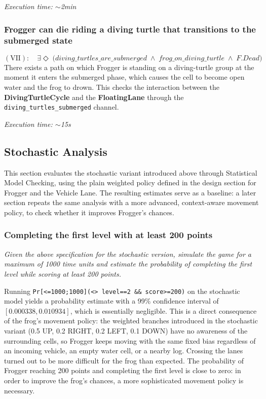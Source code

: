 \documentclass[a4paper]{article}
\begin{document}
\hfill \textit{Execution time: $\sim$2min}
\subsubsection*{Frogger can die riding a diving turtle that transitions to the submerged state}
\[ (\textrm{VII}) : \quad \exists \Diamond \; \big( 
   \textit{diving\_turtles\_are\_submerged} \;\wedge\; 
   \textit{frog\_on\_diving\_turtle} \;\wedge\; F.Dead\big) \]
There exists a path on which Frogger is standing on a diving-turtle group at 
the moment it enters the submerged phase, which causes the cell to become open 
water and the frog to drown. This checks the interaction between the 
\textbf{DivingTurtleCycle} and the \textbf{FloatingLane} through the 
\texttt{diving\_turtles\_submerged} channel.

\hfill \textit{Execution time: $\sim$15s}

\subsection{Stochastic Analysis}
This section evaluates the stochastic variant introduced above through
Statistical Model Checking, using the plain weighted policy defined
in the design section for Frogger and the Vehicle Lane. The resulting estimates serve
as a baseline: a later section repeats the same analysis with a more
advanced, context-aware movement policy, to check whether it improves
Frogger's chances.
\subsubsection{Completing the first level with at least 200 points}
\textit{Given the above specification for the stochastic version,
simulate the game for a maximum of 1000 time units and estimate the
probability of completing the first level while scoring at least
200 points.}
\vspace{\baselineskip}

Running \texttt{Pr[<=1000;1000](<> level==2 \&\& score>=200)} on the
stochastic model yields a probability estimate with a 99\% confidence
interval of $[0.000338, 0.010934]$, which is essentially negligible.
This is a direct consequence of the frog's movement policy: the
weighted branches introduced in the stochastic variant (0.5 UP, 0.2
RIGHT, 0.2 LEFT, 0.1 DOWN) have no awareness of the surrounding cells,
so Frogger keeps moving with the same fixed bias regardless of an
incoming vehicle, an empty water cell, or a nearby log. Crossing the
lanes turned out to be more difficult for the frog than expected. The
probability of Frogger reaching 200 points and completing the first
level is close to zero: in order to improve the frog's chances, a more
sophisticated movement policy is necessary.
\end{document}
